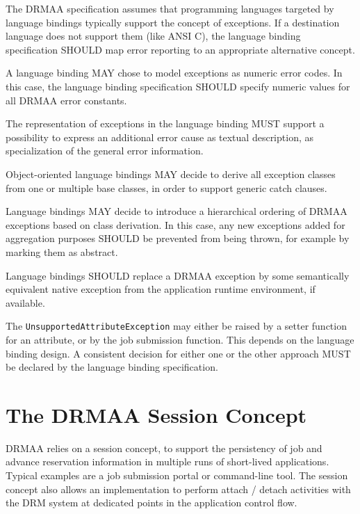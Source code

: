 \documentclass{article}
\newcommand{\h}[1]{\lstinline|#1|}
\newcommand{\langbind}[1]{\begin{shaded}#1\end{shaded}}
\newcommand{\rat}[1]{}
\begin{document}
\langbind{
The DRMAA specification assumes that programming languages targeted by language bindings typically support the concept of exceptions. If a destination language does not support them (like ANSI C), the language binding specification SHOULD map error reporting to an appropriate alternative concept.

A language binding MAY chose to model exceptions as numeric error codes. In this case, the language binding specification SHOULD specify numeric values for all DRMAA error constants.

The representation of exceptions in the language binding MUST support a possibility to express an additional error cause as textual description, as specialization of the general error information.

Object-oriented language bindings MAY decide to derive all exception classes from one or multiple base classes, in order to support generic catch clauses.

Language bindings MAY decide to introduce a hierarchical ordering of DRMAA exceptions based on class derivation. In this case, any new exceptions added for aggregation purposes SHOULD be prevented from being thrown, for example by marking them as abstract.

Language bindings SHOULD replace a DRMAA exception by some semantically equivalent native exception from the application runtime environment, if available.

The \h{UnsupportedAttributeException} may either be raised by a setter function for an attribute, or by the job submission function. This depends on the language binding design. A consistent decision for either one or the other approach MUST be declared by the language binding specification.
}

\rat{
Comparison to DRMAA 1.0: The InconsistentStateException was removed, since it is semantically equal to the InvalidStateException (conf. call Jan 7th 2010) The former HoldInconsistentStateException, ReleaseInconsistentStateException, ResumeInconsistentStateException, and SuspendInconsistentStateException from DRMAA v1.0 are now expressed as single InvalidStateException with different meaning per raising method. (F2F meeting July 2009)
}

\section{The DRMAA Session Concept}
\label{sec:sessionconcept}

DRMAA relies on a session concept, to support the persistency of job and advance reservation information in multiple runs of short-lived applications. Typical examples are a job submission portal or command-line tool. The session concept also allows an implementation to perform attach / detach activities with the DRM system at dedicated points in the application control flow.
\end{document}
